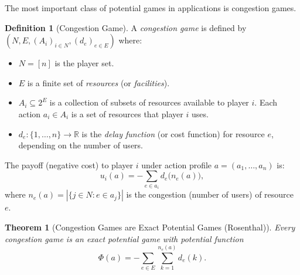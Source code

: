 \documentclass[11pt,a4paper]{article}
\theoremstyle{definition}
\newtheorem{definition}{Definition}[section]
\theoremstyle{plain}
\newtheorem{theorem}{Theorem}[section]
\theoremstyle{remark}
\newcommand{\R}{\mathbb{R}}
\begin{document}
The most important class of potential games in applications is congestion games.

\begin{definition}[Congestion Game]
\label{def:congestion-game}
A \emph{congestion game} is defined by $(N, E, (A_i)_{i \in N}, (d_e)_{e \in E})$ where:
\begin{itemize}
    \item $N = [n]$ is the player set.
    \item $E$ is a finite set of \emph{resources} (or \emph{facilities}).
    \item $A_i \subseteq 2^E$ is a collection of subsets of resources available to player
    $i$. Each action $a_i \in A_i$ is a set of resources that player $i$ uses.
    \item $d_e : \{1, \ldots, n\} \to \R$ is the \emph{delay function} (or cost function)
    for resource $e$, depending on the number of users.
\end{itemize}
The payoff (negative cost) to player $i$ under action profile $a = (a_1, \ldots, a_n)$ is:
\[
    u_i(a) = -\sum_{e \in a_i} d_e\bigl(n_e(a)\bigr),
\]
where $n_e(a) = |\{j \in N : e \in a_j\}|$ is the congestion (number of users) of
resource $e$.
\end{definition}

\begin{theorem}[Congestion Games are Exact Potential Games (Rosenthal)]
\label{thm:rosenthal}
Every congestion game is an exact potential game with potential function
\[
    \Phi(a) = -\sum_{e \in E} \sum_{k=1}^{n_e(a)} d_e(k).
\]
\end{theorem}
\end{document}
